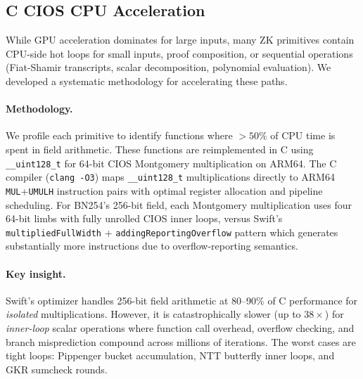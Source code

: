 \subsection{C CIOS CPU Acceleration}
\label{sec:ccios}

While GPU acceleration dominates for large inputs, many ZK primitives contain
CPU-side hot loops for small inputs, proof composition, or sequential operations
(Fiat-Shamir transcripts, scalar decomposition, polynomial evaluation). We
developed a systematic methodology for accelerating these paths.

\paragraph{Methodology.}
We profile each primitive to identify functions where $> 50\%$ of CPU time is
spent in field arithmetic. These functions are reimplemented in C using
\texttt{\_\_uint128\_t} for 64-bit CIOS Montgomery multiplication on ARM64.
The C compiler (\texttt{clang -O3}) maps \texttt{\_\_uint128\_t} multiplications
directly to ARM64 \texttt{MUL}+\texttt{UMULH} instruction pairs with optimal
register allocation and pipeline scheduling. For BN254's 256-bit field, each
Montgomery multiplication uses four 64-bit limbs with fully unrolled CIOS inner
loops, versus Swift's \texttt{multipliedFullWidth} + \texttt{addingReportingOverflow}
pattern which generates substantially more instructions due to overflow-reporting
semantics.

\paragraph{Key insight.}
Swift's optimizer handles 256-bit field arithmetic at 80--90\% of C performance
for \emph{isolated} multiplications. However, it is catastrophically slower (up
to $38\times$) for \emph{inner-loop} scalar operations where function call
overhead, overflow checking, and branch misprediction compound across millions of
iterations. The worst cases are tight loops: Pippenger bucket accumulation, NTT
butterfly inner loops, and GKR sumcheck rounds.

